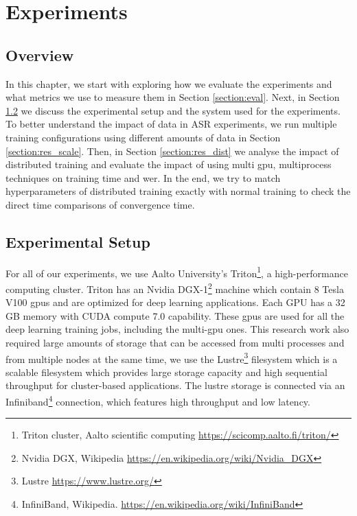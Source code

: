 \chapter{Experiments}
\label{chapter:evaluation}

\section{Overview}
In this chapter, we start with exploring how we evaluate the experiments and what metrics we use to measure them in Section \ref{section:eval}. Next, in Section \ref{section:trit} we discuss the experimental setup and the system used for the experiments. To better understand the impact of data in ASR experiments, we run multiple training configurations using different amounts of data in Section \ref{section:res_scale}. Then, in Section \ref{section:res_dist} we analyse the impact of distributed training and evaluate the impact of using multi \acrshort{gpu}, multiprocess techniques on training time and \acrshort{wer}. In the end, we try to match hyperparameters of distributed training exactly with normal training to check the direct time comparisons of convergence time. 


\section{Experimental Setup}
\label{section:trit}
For all of our experiments, we use Aalto University's Triton\footnote{Triton cluster, Aalto scientific computing \href{https://scicomp.aalto.fi/triton/}{https://scicomp.aalto.fi/triton/}}, a high-performance computing cluster. Triton has an Nvidia DGX-1\footnote{Nvidia DGX, Wikipedia \href{https://en.wikipedia.org/wiki/Nvidia_DGX}{https://en.wikipedia.org/wiki/Nvidia\_DGX}} machine which contain 8 Tesla V100 \acrshort{gpu}s and are optimized for deep learning applications. Each GPU has a 32 GB memory with CUDA compute 7.0 capability. These \acrshort{gpu}s are used for all the deep learning training jobs, including the multi-\acrshort{gpu} ones. This research work also required large amounts of storage that can be accessed from multi processes and from multiple nodes at the same time, we use the Lustre\footnote{Lustre \href{https://www.lustre.org/}{https://www.lustre.org/}} filesystem which is a scalable filesystem which provides large storage capacity and high sequential throughput for cluster-based applications. The lustre storage is connected via an Infiniband\footnote{InfiniBand, Wikipedia. \href{https://en.wikipedia.org/wiki/InfiniBand}{https://en.wikipedia.org/wiki/InfiniBand}} connection, which features high throughput and low latency.

